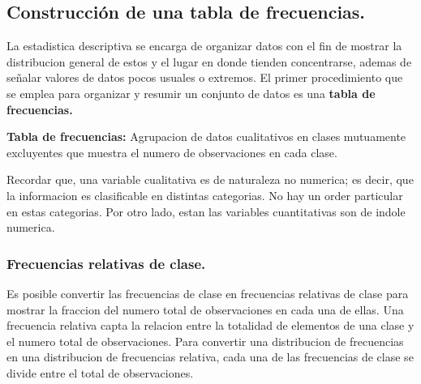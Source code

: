 \documentclass[]{article}
\begin{document}
\subsection{Construcción de una tabla de frecuencias.}
La estadistica descriptiva se encarga de organizar datos con el fin de mostrar la distribucion general de estos y el lugar en donde tienden concentrarse, ademas de señalar valores de datos pocos usuales o extremos. El primer procedimiento que se emplea para organizar y resumir un conjunto de datos es una \textbf{tabla de frecuencias.}
\begin{center}
	\textbf{Tabla de frecuencias:} Agrupacion de datos cualitativos en clases mutuamente excluyentes que muestra el numero de observaciones en cada clase.
\end{center}
Recordar que, una variable cualitativa es de naturaleza no numerica; es decir, que la informacion es clasificable en distintas categorias. No hay un order particular en estas categorias. Por otro lado, estan las variables cuantitativas son de indole numerica.
\subsubsection*{Frecuencias relativas de clase.}
Es posible convertir las frecuencias de clase en frecuencias relativas de clase para mostrar la fraccion del numero total de observaciones en cada una de ellas. Una frecuencia relativa capta la relacion entre la totalidad de elementos de una clase y el numero total de observaciones. Para convertir una distribucion de frecuencias en una distribucion de frecuencias relativa, cada una de las frecuencias de clase se divide entre el total de observaciones.
\end{document}
